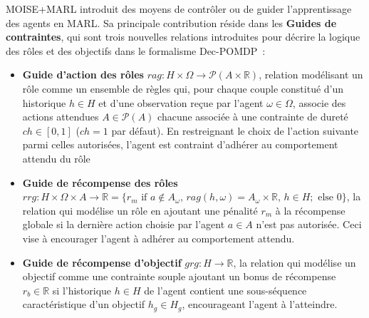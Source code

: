 \noindent MOISE+MARL introduit des moyens de contrôler ou de guider l'apprentissage des agents en MARL. Sa principale contribution réside dans les \textbf{Guides de contraintes}, qui sont trois nouvelles relations introduites pour décrire la logique des rôles et des objectifs dans le formalisme Dec-POMDP :
%
\begin{itemize}

  \item \textbf{Guide d'action des rôles} \quad $rag: H \times \Omega \rightarrow \mathcal{P}(A \times \mathbb{R})$, relation modélisant un rôle comme un ensemble de règles qui, pour chaque couple constitué d'un historique $h \in H$ et d'une observation reçue par l'agent $\omega \in \Omega$, associe des actions attendues $A \in \mathcal{P}(A)$ chacune associée à une contrainte de dureté $ch \in [0,1]$ ($ch = 1$ par défaut). En restreignant le choix de l'action suivante parmi celles autorisées, l'agent est contraint d'adhérer au comportement attendu du rôle
  \item \textbf{Guide de récompense des rôles} \quad $rrg: H \times \Omega \times A \to \mathbb{R} = \{r_m \text{ if } a \notin A_\omega \text{, } rag(h, \omega) \allowbreak = \allowbreak A_\omega \times \mathbb{R} \text{, } h \in H; \text{ else } 0\}$, la relation qui modélise un rôle en ajoutant une pénalité $r_m$ à la récompense globale si la dernière action choisie par l'agent $a \in A$ n'est pas autorisée. Ceci vise à encourager l'agent à adhérer au comportement attendu.
  \item \textbf{Guide de récompense d'objectif} \quad $grg: H \rightarrow \mathbb{R}$, la relation qui modélise un objectif comme une contrainte souple ajoutant un bonus de récompense $r_b \in \mathbb{R}$ si l'historique $h \in H$ de l'agent contient une sous-séquence caractéristique d'un objectif $h_g \in H_g$, encourageant l'agent à l'atteindre.
\end{itemize}

